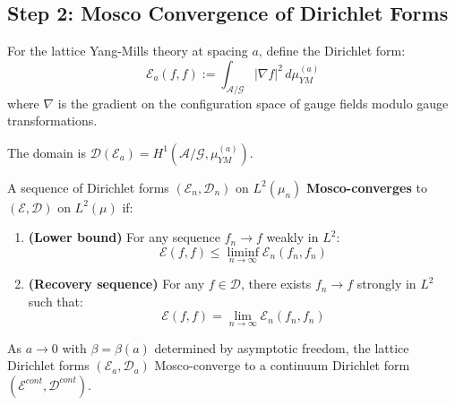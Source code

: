 \subsection{Step 2: Mosco Convergence of Dirichlet Forms}
\label{subsec:roadmap2-step2}

\begin{definition}
\label{def:lattice-dirichlet}
For the lattice Yang-Mills theory at spacing $a$, define the Dirichlet form:
\[
\mathcal{E}_a(f, f) := \int_{\mathcal{A}/\mathcal{G}} |\nabla f|^2 \, d\mu_{YM}^{(a)}
\]
where $\nabla$ is the gradient on the configuration space of gauge fields modulo 
gauge transformations.

The domain is $\mathcal{D}(\mathcal{E}_a) = H^1(\mathcal{A}/\mathcal{G}, \mu_{YM}^{(a)})$.
\end{definition}

\begin{definition}
\label{def:mosco-app89}
A sequence of Dirichlet forms $(\mathcal{E}_n, \mathcal{D}_n)$ on $L^2(\mu_n)$ 
\textbf{Mosco-converges} to $(\mathcal{E}, \mathcal{D})$ on $L^2(\mu)$ if:
\begin{enumerate}[label=(\roman*)]
\item \textbf{(Lower bound)} For any sequence $f_n \to f$ weakly in $L^2$:
\[
\mathcal{E}(f, f) \leq \liminf_{n \to \infty} \mathcal{E}_n(f_n, f_n)
\]

\item \textbf{(Recovery sequence)} For any $f \in \mathcal{D}$, there exists 
$f_n \to f$ strongly in $L^2$ such that:
\[
\mathcal{E}(f, f) = \lim_{n \to \infty} \mathcal{E}_n(f_n, f_n)
\]
\end{enumerate}
\end{definition}

\begin{theorem}
\label{thm:mosco-ym}
As $a \to 0$ with $\beta = \beta(a)$ determined by asymptotic freedom, the lattice 
Dirichlet forms $(\mathcal{E}_a, \mathcal{D}_a)$ Mosco-converge to a continuum 
Dirichlet form $(\mathcal{E}^{cont}, \mathcal{D}^{cont})$.
\end{theorem}

